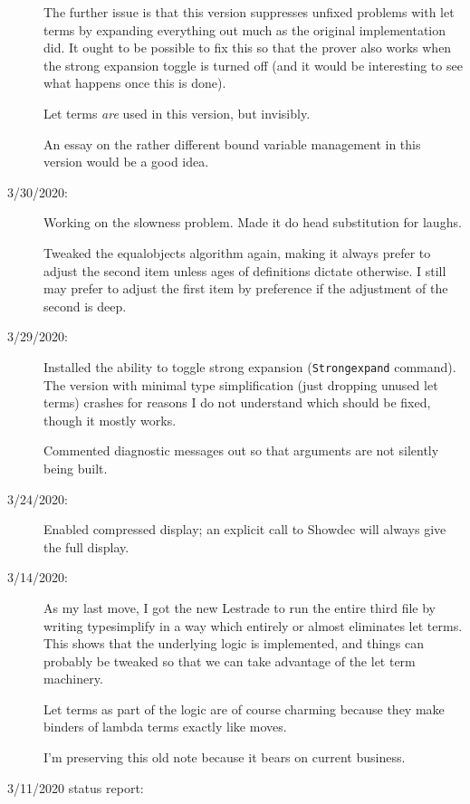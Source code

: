 \documentclass[12pt]{article}
\begin{document}
\begin{description}
The further issue is that this version suppresses unfixed problems with let terms by expanding everything out much as the original implementation did.  It ought to be possible to fix this so that the prover also works when the strong expansion toggle is turned off (and it would be interesting to see what happens once this is done).

Let terms {\em are\/} used in this version, but invisibly.

An essay on the rather different bound variable management in this version would be a good idea.

\item[3/30/2020:]  Working on the slowness problem.  Made it do head substitution for laughs.

Tweaked the equalobjects algorithm again, making it always prefer to adjust the second item unless
ages of definitions dictate otherwise.  I still may prefer to adjust the first item by preference if
the adjustment of the second is deep.

\item[3/29/2020:]  Installed the ability to toggle strong expansion ({\tt Strongexpand} command).  The version with minimal
type simplification (just dropping unused let terms) crashes for reasons I do not understand which should be
fixed, though it mostly works.

Commented diagnostic messages out so that arguments are not silently being built.





\item[3/24/2020:] 

Enabled compressed display;  an explicit call to Showdec will always give the full display.

\item[3/14/2020:] 

As my last move, I got the new Lestrade to run the entire third file by writing typesimplify in a way
which entirely or almost eliminates let terms.  This shows that the underlying logic is implemented, and things
can probably be tweaked so that we can take advantage of the let term machinery.

Let terms as part of the logic are of course charming because they make binders of lambda terms
exactly like moves.

I'm preserving this old note because it bears on current business.



\item[3/11/2020 status report:]


\end{description}
\end{document}
